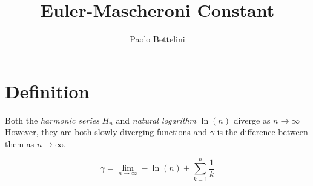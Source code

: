 \documentclass{article}
\title{Euler-Mascheroni Constant}
\author{Paolo Bettelini}
\date{}
\begin{document}
\maketitle
\tableofcontents
\pagebreak

\section{Definition}

Both the \textit{harmonic series} \(H_n\) and \textit{natural logarithm} \(\ln(n)\) diverge as \(n\to \infty\) \\
However, they are both slowly diverging functions and \(\gamma\) is the difference between them as \(n\to \infty\).

\[
    \gamma = \lim_{n\to\infty} -\ln(n)+\sum_{k=1}^{n}\frac{1}{k}
\]

\pagebreak
\end{document}
